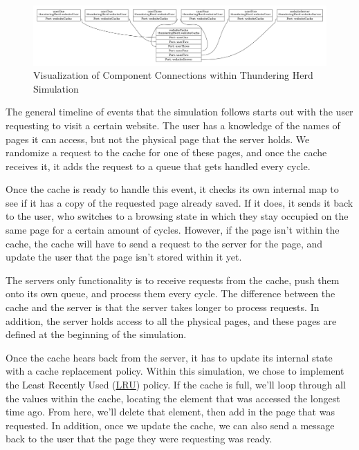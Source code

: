 \documentclass{article}
\begin{document}
\begin{figure}[H]
    \includegraphics[scale=0.22]{images/thunderingHerd.png}
    \caption{Visualization of Component Connections within Thundering Herd Simulation}
\end{figure}

The general timeline of events that the simulation follows starts out with the user requesting to visit a certain website.  The user has a knowledge of the names of pages it can access, but not the physical page that the server holds.  We randomize a request to the cache for one of these pages, and once the cache receives it, it adds the request to a queue that gets handled every cycle.  \newline

Once the cache is ready to handle this event, it checks its own internal map to see if it has a copy of the requested page already saved.  If it does, it sends it back to the user, who switches to a browsing state in which they stay occupied on the same page for a certain amount of cycles.  However, if the page isn't within the cache, the cache will have to send a request to the server for the page, and update the user that the page isn't stored within it yet.  \newline

The servers only functionality is to receive requests from the cache, push them onto its own queue, and process them every cycle.  The difference between the cache and the server is that the server takes longer to process requests.  In addition, the server holds access to all the physical pages, and these pages are defined at the beginning of the simulation. \newline

Once the cache hears back from the server, it has to update its internal state with a cache replacement policy.  Within this simulation, we chose to implement the Least Recently Used (\href{https://en.wikipedia.org/wiki/Cache_replacement_policies#Least_recently_used_(LRU)}{LRU}) policy.  If the cache is full, we'll loop through all the values within the cache, locating the element that was accessed the longest time ago.  From here, we'll delete that element, then add in the page that was requested.  In addition, once we update the cache, we can also send a message back to the user that the page they were requesting was ready. \newline
\end{document}
